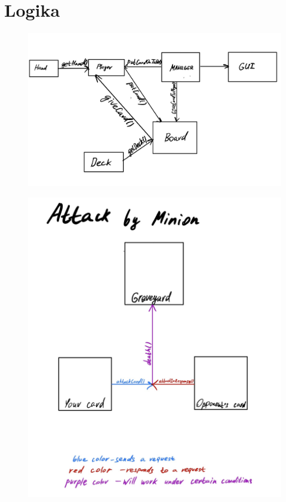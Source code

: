 \documentclass[12pt]{article}
\begin{document}
\section{Logika}
\begin{figure}[h]
\centering 
\includegraphics[width=1\textwidth]{img/Logic.jpg}
\end{figure}
\begin{figure}[h]
\centering 
\includegraphics[width=1\textwidth]{img/minion.jpg}
\end{figure}
\end{document}
